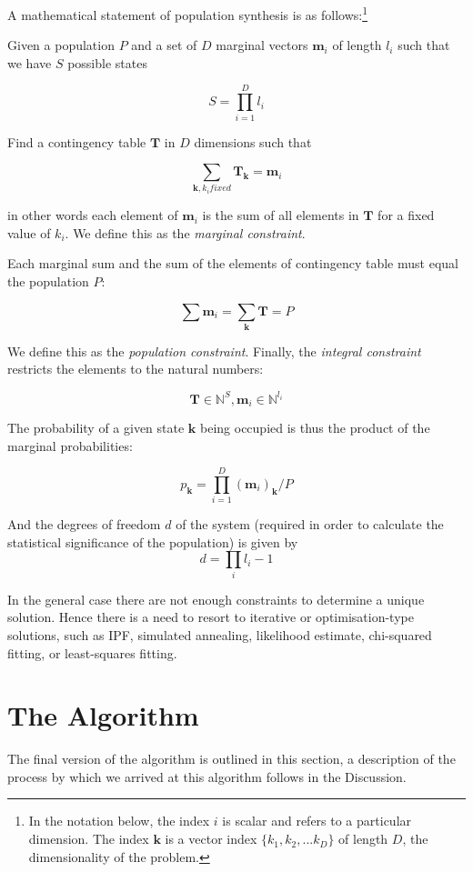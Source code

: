 \documentclass[]{article}
\let\rmarkdownfootnote\footnote%
\def\footnote{\protect\rmarkdownfootnote}
\begin{document}
A mathematical statement of population synthesis is as
follows:\footnote{In the notation below, the index \(i\) is scalar and
  refers to a particular dimension. The index \(\mathbf{k}\) is a vector
  index \(\{k_1, k_2,...k_D\}\) of length \(D\), the dimensionality of
  the problem.}

Given a population \(P\) and a set of \(D\) marginal vectors
\(\mathbf{m}_i\) of length \(l_i\) such that we have \(S\) possible
states

\[S=\prod\limits_{i=1}^{D}l_i\]

Find a contingency table \(\mathbf T\) in \(D\) dimensions such that

\[\sum\limits_{\mathbf{k}, k_i fixed} \mathbf{T}_\mathbf{k} = \mathbf{m}_i\]

in other words each element of \(\mathbf{m}_i\) is the sum of all
elements in \(\mathbf{T}\) for a fixed value of \(k_i\). We define this
as the \emph{marginal constraint}.

Each marginal sum and the sum of the elements of contingency table must
equal the population \(P\):

\[\sum\limits \mathbf{m}_{i} = \sum\limits_\mathbf{k} \mathbf{T} = P\]

We define this as the \emph{population constraint}. Finally, the
\emph{integral constraint} restricts the elements to the natural
numbers:

\[{\mathbf{T} \in \mathbb{N}^S,\mathbf{m}_i} \in \mathbb{N}^{l_i}\]

The probability of a given state \(\mathbf{k}\) being occupied is thus
the product of the marginal probabilities:

\[p_{\mathbf{k}} = \prod\limits_{i=1}^{D}(\mathbf{m}_i)_\mathbf{k}/P\]

And the degrees of freedom \(d\) of the system (required in order to
calculate the statistical significance of the population) is given by
\[d=\prod\limits_{i}l_i-1\]

In the general case there are not enough constraints to determine a
unique solution. Hence there is a need to resort to iterative or
optimisation-type solutions, such as IPF, simulated annealing,
likelihood estimate, chi-squared fitting, or least-squares fitting.

\section{The Algorithm}\label{the-algorithm}

The final version of the algorithm is outlined in this section, a
description of the process by which we arrived at this algorithm follows
in the Discussion.
\end{document}
